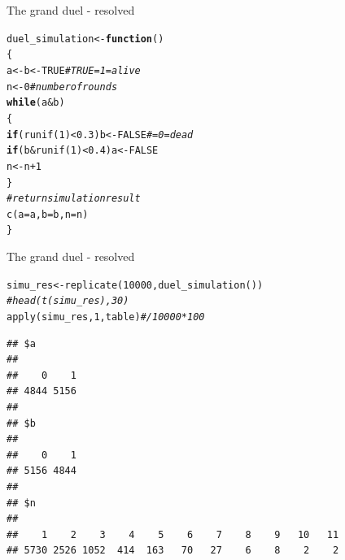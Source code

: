 \documentclass[xcolor=table,           xcolor=dvipsnames]{beamer}\usepackage[]{graphicx}\usepackage[]{color}
\makeatletter
\newcommand{\hlnum}[1]{\textcolor[rgb]{0,0,0}{#1}}
\newcommand{\hlcom}[1]{\textcolor[rgb]{0,0.392,0}{\textit{#1}}}
\newcommand{\hlopt}[1]{\textcolor[rgb]{0,0,0}{#1}}
\newcommand{\hlstd}[1]{\textcolor[rgb]{0,0,0}{#1}}
\newcommand{\hlkwa}[1]{\textcolor[rgb]{1,0,0}{\textbf{#1}}}
\newcommand{\hlkwb}[1]{\textcolor[rgb]{0,0,0}{#1}}
\newcommand{\hlkwc}[1]{\textcolor[rgb]{1,0,1}{#1}}
\newcommand{\hlkwd}[1]{\textcolor[rgb]{0,0,1}{#1}}
\newenvironment{kframe}{%
 \def\at@end@of@kframe{}%
 \ifinner\ifhmode%
  \def\at@end@of@kframe{\end{minipage}}%
  \begin{minipage}{\columnwidth}%
 \fi\fi%
 \def\FrameCommand##1{\hskip\@totalleftmargin \hskip-\fboxsep
 \colorbox{shadecolor}{##1}\hskip-\fboxsep
     \hskip-\linewidth \hskip-\@totalleftmargin \hskip\columnwidth}%
 \MakeFramed {\advance\hsize-\width
   \@totalleftmargin\z@ \linewidth\hsize
   \@setminipage}}%
 {\par\unskip\endMakeFramed%
 \at@end@of@kframe}
\newenvironment{knitrout}{}{} %
\makeatother
\begin{document}

\begin{frame}[fragile]{The grand duel - resolved}
\begin{knitrout}
\color{fgcolor}\begin{kframe}
\begin{alltt}
\hlstd{duel_simulation} \hlkwb{<-} \hlkwa{function}\hlstd{()}
\hlstd{\{}
\hlstd{a} \hlkwb{<-} \hlstd{b} \hlkwb{<-} \hlnum{TRUE} \hlcom{# TRUE = 1 = alive}
\hlstd{n} \hlkwb{<-} \hlnum{0} \hlcom{# number of rounds}
\hlkwa{while}\hlstd{(a}\hlopt{&}\hlstd{b)}
  \hlstd{\{}
  \hlkwa{if}\hlstd{(}\hlkwd{runif}\hlstd{(}\hlnum{1}\hlstd{)}\hlopt{<}\hlnum{0.3}\hlstd{) b} \hlkwb{<-} \hlnum{FALSE} \hlcom{# = 0 = dead}
  \hlkwa{if}\hlstd{(b}\hlopt{&}\hlkwd{runif}\hlstd{(}\hlnum{1}\hlstd{)}\hlopt{<}\hlnum{0.4}\hlstd{) a} \hlkwb{<-} \hlnum{FALSE}
  \hlstd{n} \hlkwb{<-} \hlstd{n}\hlopt{+}\hlnum{1}
  \hlstd{\}}
\hlcom{# return simulation result}
\hlkwd{c}\hlstd{(}\hlkwc{a}\hlstd{=a,}\hlkwc{b}\hlstd{=b,} \hlkwc{n}\hlstd{=n)}
\hlstd{\}}
\end{alltt}
\end{kframe}
\end{knitrout}
\end{frame}


\begin{frame}[fragile]{The grand duel - resolved}
\vspace{-1em}
\begin{knitrout}\small
{}\color{fgcolor}\begin{kframe}
\begin{alltt}
\hlstd{simu_res} \hlkwb{<-} \hlkwd{replicate}\hlstd{(}\hlnum{10000}\hlstd{,} \hlkwd{duel_simulation}\hlstd{())}
\hlcom{# head(t(simu_res), 30)}
\hlkwd{apply}\hlstd{(simu_res,} \hlnum{1}\hlstd{, table)} \hlcom{# / 10000 *100}
\end{alltt}
\begin{verbatim}
## $a
## 
##    0    1 
## 4844 5156 
## 
## $b
## 
##    0    1 
## 5156 4844 
## 
## $n
## 
##    1    2    3    4    5    6    7    8    9   10   11 
## 5730 2526 1052  414  163   70   27    6    8    2    2
\end{verbatim}
\end{kframe}
\end{knitrout}
\end{frame}
\end{document}
